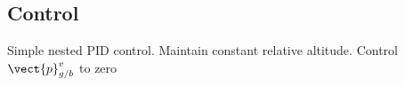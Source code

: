
\subsection{Control}
Simple nested PID control. Maintain constant relative altitude. Control
$\vect{p}_{g/b}^v$ to zero
